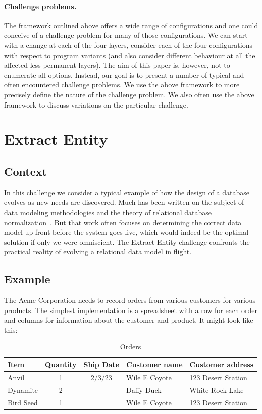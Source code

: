 \documentclass[english,submission]{programming}
\begin{document}
\paragraph{Challenge problems.}
The framework outlined above offers a wide range of configurations and one could conceive of
a challenge problem for many of those configurations. We can start with a change at each of the
four layers, consider each of the four configurations with respect to program variants (and also
consider different behaviour at all the affected less permanent layers). The aim of this paper
is, however, not to enumerate all options. Instead, our goal is to present a number of typical
and often encountered challenge problems. We use the above framework to more precisely define
the nature of the challenge problem. We also often use the above framework to discuss variations
on the particular challenge.

\newpage

\section{Extract Entity}

\subsection{Context}
In this challenge we consider a typical example of how the design of a database evolves as new needs are discovered. Much has been written on the subject of data modeling methodologies and the theory of relational database normalization~\cite{Molina08}. But that work often focuses on determining the correct data model up front before the system goes live, which would indeed be the optimal solution if only we were omniscient. The Extract Entity challenge confronts the practical reality of evolving a relational data model in flight.

\subsection{Example}
The Acme Corporation needs to record orders from various customers for various products. The simplest implementation is a spreadsheet with a row for each order and columns for information about the customer and product. It might look like this:


\begin{table}[h!]
\centering
  \begin{tabular}{ |l|c|c|l|l|}
   \hline
   Item & Quantity & Ship Date & Customer name & Customer address \\
   \hline \hline
   Anvil & 1 & 2/3/23 & Wile E Coyote & 123 Desert Station \\
   \hline
   Dynamite & 2 & & Daffy Duck & White Rock Lake \\
   \hline
   Bird Seed & 1 & & Wile E Coyote & 123 Desert Station \\
   \hline
  \end{tabular}
\caption{Orders}
\end{table}
\end{document}

